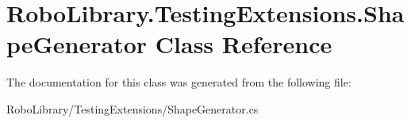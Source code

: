 \hypertarget{class_robo_library_1_1_testing_extensions_1_1_shape_generator}{}\section{Robo\+Library.\+Testing\+Extensions.\+Shape\+Generator Class Reference}
\label{class_robo_library_1_1_testing_extensions_1_1_shape_generator}


The documentation for this class was generated from the following file\+:\begin{DoxyCompactItemize}
\item 
Robo\+Library/\+Testing\+Extensions/Shape\+Generator.\+cs\end{DoxyCompactItemize}
